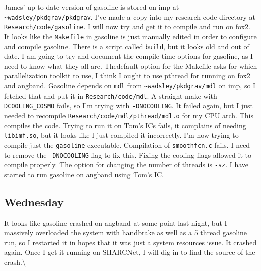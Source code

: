 \documentclass[11pt,letterpaper]{article}
\begin{document}
James' up-to date version of gasoline is stored on imp at
\verb!~wadsley/pkdgrav/pkdgrav!. I've made a copy into my research code
directory at \verb!Research/code/gasoline!. I will now try and get it to
compile and run on fox2. It looks like the \verb!Makefile! in gasoline
is just manually edited in order to configure and compile gasoline.
There is a script called \verb!build!, but it looks old and out of date.
I am going to try and document the compile time options for gasoline, as
I need to know what they all are. Thedefault option for the Makefile
asks for which parallelization toolkit to use, I think I ought to use
pthread for running on fox2 and angband. Gasoline depends on \verb!mdl!
from \verb!~wadsley/pkdgrav/mdl! on imp, so I fetched that and put it in
\verb!Research/code/mdl!. A straight make with \verb!-DCOOLING_COSMO!
fails, so I'm trying with \verb!-DNOCOOLING!. It failed again, but I
just needed to recompile \verb!Research/code/mdl/pthread/mdl.o! for my
CPU arch. This compiles the code. Trying to run it on Tom's ICs fails,
it complains of needing \verb!libimf.so!, but it looks like I just
compiled it incorrectly. I'm now trying to compile just the
\verb!gasoline! executable. Compilation of \verb!smoothfcn.c! fails. I
need to remove the \verb!-DNOCOOLING! flag to fix this. Fixing the
cooling flags allowed it to compile properly. The option for changing
the number of threads is \verb!-sz!. I have started to run gasoline on
angband using Tom's IC.

\subsection{Wednesday}

It looks like gasoline crashed on angband at some point last night, but
I massively overloaded the system with handbrake as well as a 5 thread
gasoline run, so I restarted it in hopes that it was just a system
resources issue. It crashed again. Once I get it running on SHARCNet, I
will dig in to find the source of the crash.\textbackslash{}
\end{document}
